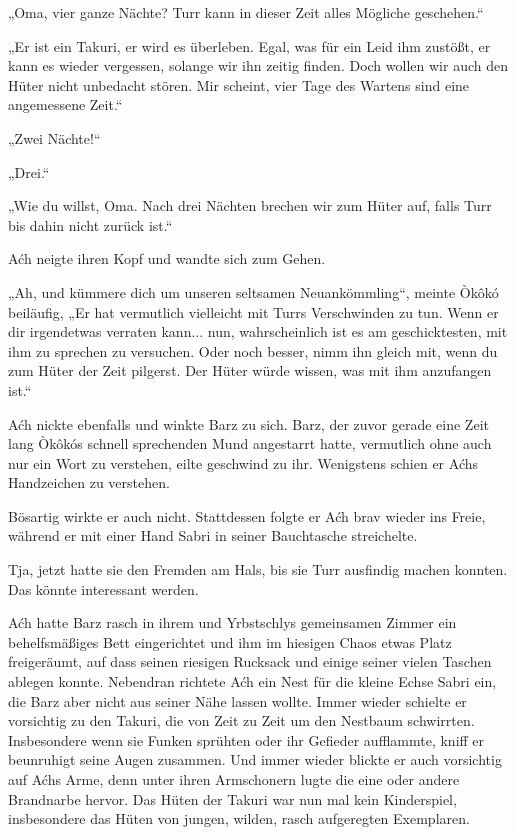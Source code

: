 „Oma, vier ganze Nächte? Turr kann in dieser Zeit alles Mögliche geschehen.“

„Er ist ein Takuri, er wird es überleben. Egal, was für ein Leid ihm zustößt, er kann es wieder vergessen, solange wir ihn zeitig finden. Doch wollen wir auch den Hüter nicht unbedacht stören. Mir scheint, vier Tage des Wartens sind eine angemessene Zeit.“

„Zwei Nächte!“

„Drei.“

„Wie du willst, Oma. Nach drei Nächten brechen wir zum Hüter auf, falls Turr bis dahin nicht zurück ist.“

Aćh neigte ihren Kopf und wandte sich zum Gehen.

„Ah, und kümmere dich um unseren seltsamen Neuankömmling“, meinte Òkôkó beiläufig, „Er hat vermutlich vielleicht mit Turrs Verschwinden zu tun. Wenn er dir irgendetwas verraten kann... nun, wahrscheinlich ist es am geschicktesten, mit ihm zu sprechen zu versuchen. Oder noch besser, nimm ihn gleich mit, wenn du zum Hüter der Zeit pilgerst. Der Hüter würde wissen, was mit ihm anzufangen ist.“

Aćh nickte ebenfalls und winkte Barz zu sich. Barz, der zuvor gerade eine Zeit lang Òkôkós schnell sprechenden Mund angestarrt hatte, vermutlich ohne auch nur ein Wort zu verstehen, eilte geschwind zu ihr. Wenigstens schien er Aćhs Handzeichen zu verstehen.

Bösartig wirkte er auch nicht. Stattdessen folgte er Aćh brav wieder ins Freie, während er mit einer Hand Sabri in seiner Bauchtasche streichelte.

Tja, jetzt hatte sie den Fremden am Hals, bis sie Turr ausfindig machen konnten. Das könnte interessant werden.\bigskip







Aćh hatte Barz rasch in ihrem und Yrbstschlys gemeinsamen Zimmer ein behelfsmäßiges Bett eingerichtet und ihm im hiesigen Chaos etwas Platz freigeräumt, auf dass seinen riesigen Rucksack und einige seiner vielen Taschen ablegen konnte. Nebendran richtete Aćh ein Nest für die kleine Echse Sabri ein, die Barz aber nicht aus seiner Nähe lassen wollte. Immer wieder schielte er vorsichtig zu den Takuri, die von Zeit zu Zeit um den Nestbaum schwirrten. Insbesondere wenn sie Funken sprühten oder ihr Gefieder aufflammte, kniff er beunruhigt seine Augen zusammen. Und immer wieder blickte er auch vorsichtig auf Aćhs Arme, denn unter ihren Armschonern lugte die eine oder andere Brandnarbe hervor. Das Hüten der Takuri war nun mal kein Kinderspiel, insbesondere das Hüten von jungen, wilden, rasch aufgeregten Exemplaren.


